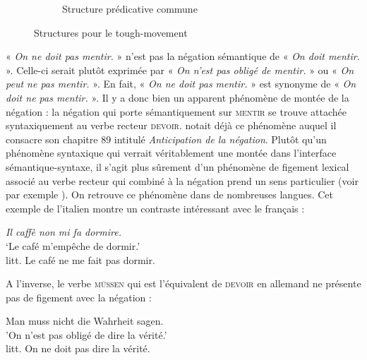 {\begin{figure}[H]
\begin{subfigure}[h]{\textwidth}
		\caption{Structure prédicative commune}
	\end{subfigure}
\caption{Structures pour le tough-movement\label{fig:13-tough}}
\end{figure}

 « \textit{On ne doit pas mentir.} » n’est pas la négation sémantique de « \textit{On doit mentir.} ». Celle-ci serait plutôt exprimée par « \textit{On n’est pas obligé de mentir.} » ou « \textit{On peut ne pas mentir.} ». En fait, « \textit{On ne doit pas mentir.} » est synonyme de « \textit{On doit ne pas mentir.} ». Il y a donc bien un apparent phénomène de montée de la négation : la négation qui porte sémantiquement sur \textsc{mentir} se trouve attachée syntaxiquement au verbe recteur \textsc{devoir}. \citet{tesniere1959elements} notait déjà ce phénomène auquel il consacre son chapitre 89 intitulé \textit{Anticipation de la négation}. Plutôt qu’un phénomène syntaxique qui verrait véritablement une montée dans l’interface sémantique-syntaxe, il s’agit plus sûrement d’un phénomène de figement lexical associé au verbe recteur qui combiné à la négation prend un sens particulier (voir par exemple \citealt{forest1994negation}). On retrouve ce phénomène dans de nombreuses langues. Cet exemple de l’italien montre un contraste intéressant avec le français :

\begin{exe}
\exi{} \textit{Il caffè non mi fa dormire.}\\
‘Le café m’empêche de dormir.’\\
litt. Le café ne me fait pas dormir.
\end{exe}

A l'inverse, le verbe \textsc{müssen} qui est l'équivalent de \textsc{devoir} en allemand ne présente pas de figement avec la négation :

\begin{exe}
\exi{} Man muss nicht die Wahrheit sagen.\\
'On n'est pas obligé de dire la vérité.'\\
litt. On ne doit pas dire la vérité.
\end{exe}}

